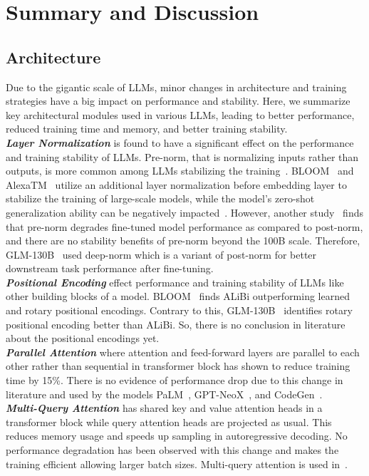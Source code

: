 \section{Summary and Discussion}
\subsection{Architecture}
Due to the gigantic scale of LLMs, minor changes in architecture and training strategies have a big impact on performance and stability. Here, we summarize key architectural modules used in various LLMs, leading to better performance, reduced training time and memory, and better training stability. \\
\emph{\textbf{Layer Normalization}} is found to have a significant effect on the performance and training stability of LLMs. Pre-norm, that is normalizing inputs rather than outputs, is more common among LLMs stabilizing the training~\cite{GPT-3, touvron2023llama, PanGU_alpha}. BLOOM~\cite{BLOOM} and AlexaTM~\cite{soltan2022alexatm} utilize an additional layer normalization before embedding layer to stabilize the training of large-scale models, while the model's zero-shot generalization ability can be negatively impacted~\cite{BLOOM}. However, another study~\cite{GLM-130B} finds that pre-norm degrades fine-tuned model performance as compared to post-norm, and there are no stability benefits of pre-norm beyond the 100B scale. Therefore, GLM-130B~\cite{GLM-130B} used deep-norm which is a variant of post-norm for better downstream task performance after fine-tuning.   \\
\emph{\textbf{Positional Encoding}} effect performance and training stability of LLMs like other building blocks of a model. BLOOM~\cite{BLOOM} finds ALiBi outperforming learned and rotary positional encodings. Contrary to this, GLM-130B~\cite{GLM-130B} identifies rotary positional encoding better than ALiBi. So, there is no conclusion in literature about the positional encodings yet. \\
\emph{\textbf{Parallel Attention}} where attention and feed-forward layers are parallel to each other rather than sequential in transformer block has shown to reduce training time by 15\%. There is no evidence of performance drop due to this change in literature and used by the models PaLM~\cite{PaLM}, GPT-NeoX~\cite{GPT_NeoX}, and CodeGen~\cite{CodeGen}.  \\
\emph{\textbf{Multi-Query Attention}} has shared key and value attention heads in a transformer block while query attention heads are projected as usual. This reduces memory usage and speeds up sampling in autoregressive decoding. No performance degradation has been observed with this change and makes the training efficient allowing larger batch sizes. Multi-query attention is used in~\cite{PaLM, li2022competition}.    \\
